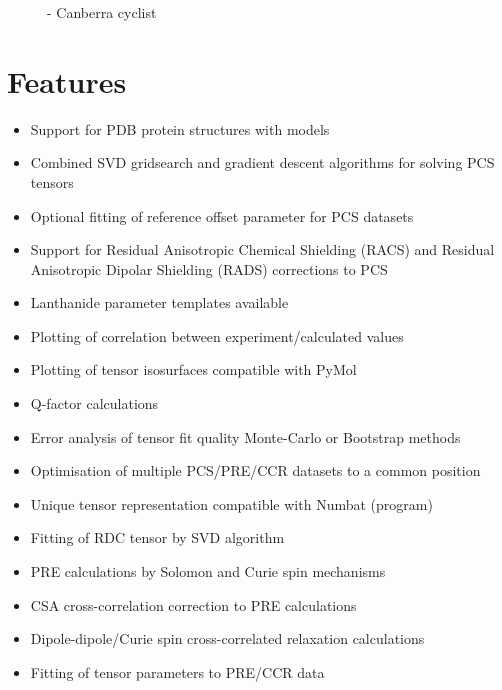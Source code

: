 \documentclass[a4paper,10pt,english]{sphinxmanual}
\begin{document}
\begin{figure}[htbp]
\centering
\capstart

\noindent{}
\caption{ - Canberra cyclist}\label{\detokenize{index:id1}}\end{figure}


\chapter{Features}
\label{\detokenize{index:features}}\begin{itemize}
\item {} 
Support for PDB protein structures with models

\item {} 
Combined SVD gridsearch and gradient descent algorithms for solving PCS tensors

\item {} 
Optional fitting of reference offset parameter for PCS datasets

\item {} 
Support for Residual Anisotropic Chemical Shielding (RACS) and Residual Anisotropic Dipolar Shielding (RADS) corrections to PCS

\item {} 
Lanthanide parameter templates available

\item {} 
Plotting of correlation between experiment/calculated values

\item {} 
Plotting of tensor isosurfaces compatible with PyMol

\item {} 
Q-factor calculations

\item {} 
Error analysis of tensor fit quality Monte-Carlo or Bootstrap methods

\item {} 
Optimisation of multiple PCS/PRE/CCR datasets to a common position

\item {} 
Unique tensor representation compatible with Numbat (program)

\item {} 
Fitting of RDC tensor by SVD algorithm

\item {} 
PRE calculations by Solomon and Curie spin mechanisms

\item {} 
CSA cross-correlation correction to PRE calculations

\item {} 
Dipole-dipole/Curie spin cross-correlated relaxation calculations

\item {} 
Fitting of tensor parameters to PRE/CCR data

\end{itemize}
\end{document}
